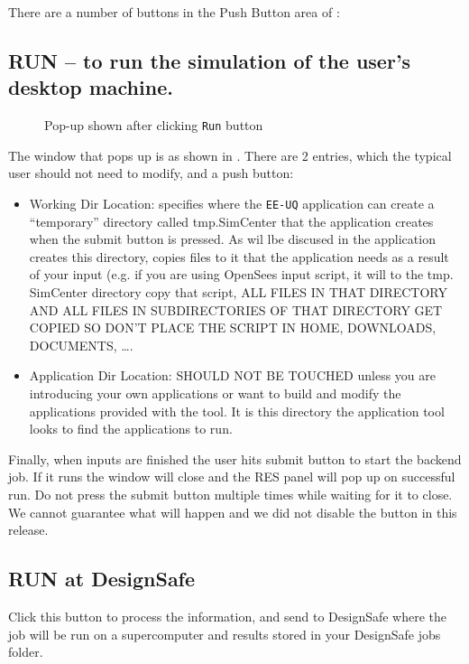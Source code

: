 There are a number of buttons in the Push Button area of :

\subsection{RUN – to run the simulation of the user’s desktop machine.}
\begin{figure}[!htbp]
  \caption{Pop-up shown after clicking \texttt{Run} button}
  \label{fig:figure15}
\end{figure}

The window that pops up is as shown in . There
are 2 entries, which the typical user should not need to modify, and a push button:

\begin{itemize}
\item Working Dir Location: specifies where the \texttt{EE-UQ} application can 
create a “temporary” directory called tmp.SimCenter that the application 
creates when the submit button is pressed. As wil lbe discused in  
the application creates this directory, copies files to it that the application needs as a
result of your input (e.g. if you are using OpenSees input script, it
will to the tmp. SimCenter directory copy that script, ALL FILES IN
THAT DIRECTORY AND ALL FILES IN SUBDIRECTORIES OF THAT DIRECTORY GET
COPIED SO DON’T PLACE THE SCRIPT IN HOME, DOWNLOADS, DOCUMENTS, ….
\item Application Dir Location: SHOULD NOT BE TOUCHED unless you are introducing your own applications or want to build and modify the 
applications provided with the tool. It is this directory the
application tool looks to find the applications to run.
\end{itemize}


Finally, when inputs are finished the user hits submit button to start
the backend job. If it runs the window will close and the RES panel
will pop up on successful run. Do not press the submit button multiple
times while waiting for it to close. We cannot guarantee what will
happen and we did not disable the button in this release.

\subsection{RUN at DesignSafe}
Click this button to process the information, and send to DesignSafe
where the job will be run on a supercomputer and results stored in
your DesignSafe jobs folder.

